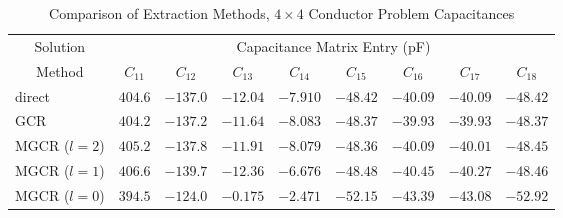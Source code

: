 \begin{table}
\begin{center}
\begin{tabular}{|l|c|c|c|c|c|c|c|c|}\hline\hline
\multicolumn{1}{|c|}{Solution}&\multicolumn{8}{|c|}{Capacitance Matrix Entry (pF)}\\\cline{2-9}
\multicolumn{1}{|c|}{Method} & $ C_{11} $ & $ C_{12} $ & $ C_{13} $ & $ C_{14} $ & $ C_{15} $ & $ C_{16} $ & $ C_{17} $ & $ C_{18} $ \\\hline\hline
%
direct &$404.6$& $-137.0$& $-12.04$ &$-7.910$& $-48.42$ &$-40.09$&$-40.09$&$-48.42$\\
GCR& $404.2$ & $-137.2$ &$-11.64$ & $-8.083$ & $-48.37$ & $-39.93$ & $-39.93$ & $-48.37$\\
MGCR ($l=2$)& $405.2$ & $-137.8$ & $-11.91$ & $-8.079$ & $-48.36$ & $-40.09$ & $-40.01$ &$-48.45$\\ 
MGCR ($l=1$)& $406.6$ & $-139.7$ & $-12.36$ & $-6.676$ & $-48.48$ & $-40.45$ & $-40.27$ & $-48.46$\\
MGCR ($l=0$)&$394.5$ & $-124.0$ & $-0.175$ & $-2.471$ & $-52.15$ & $-43.39$ & $-43.08$ & $-52.92$\\\hline
\end{tabular}
\end{center}
\caption{Comparison of Extraction Methods, $4\times 4$ Conductor Problem Capacitances}
\label{values}
\end{table}


